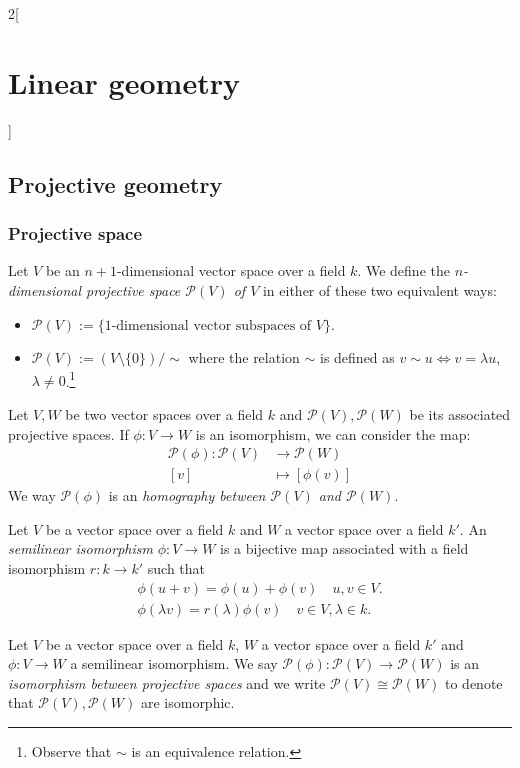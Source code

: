 \documentclass[class=article,10pt,crop=false]{standalone}
\begin{document}
\begin{multicols}{2}[\section{Linear geometry}]
\subsection{Projective geometry}
\subsubsection*{Projective space}
\begin{definition}
Let $V$ be an $n+1$-dimensional vector space over a field $k$. We define the \textit{$n$-dimensional projective space $\mathcal{P}(V)$ of $V$} in either of these two equivalent ways:
\begin{itemize}
    \item $\displaystyle\mathcal{P}(V):=\{\text{1-dimensional vector subspaces of $V$}\}$.
    \item $\displaystyle\mathcal{P}(V):=(V\setminus\{0\})/\sim$ where the relation $\sim$ is defined as $v\sim u\iff v=\lambda u$, $\lambda\ne 0$.\footnote{Observe that $\sim$ is an equivalence relation.}
\end{itemize}
\end{definition}
\begin{definition}
Let $V,W$ be two vector spaces over a field $k$ and $\mathcal{P}(V),\mathcal{P}(W)$ be its associated projective spaces. If $\phi:V\rightarrow W$ is an isomorphism, we can consider the map:
\begin{align*}
    \mathcal{P}(\phi):\mathcal{P}(V)&\rightarrow\mathcal{P}(W)\\
    [v]&\mapsto [\phi(v)]
\end{align*}
We way $\mathcal{P}(\phi)$ is an \textit{homography between $\mathcal{P}(V)$ and $\mathcal{P}(W)$}.
\end{definition}
\begin{definition}
Let $V$ be a vector space over a field $k$ and $W$ a vector space over a field $k'$. An \textit{semilinear isomorphism} $\phi:V\rightarrow W$ is a bijective map associated with a field isomorphism $r:k\rightarrow k'$ such that
\begin{gather*}
    \phi(u+v)=\phi(u)+\phi(v)\quad u,v\in V.\\
    \phi(\lambda v)=r(\lambda)\phi(v)\quad v\in V,\lambda\in k.
\end{gather*}
\end{definition}
\begin{definition}
Let $V$ be a vector space over a field $k$, $W$ a vector space over a field $k'$ and $\phi:V\rightarrow W$ a semilinear isomorphism. We say $\mathcal{P}(\phi):\mathcal{P}(V)\rightarrow\mathcal{P}(W)$ is an \textit{isomorphism between projective spaces} and we write $\mathcal{P}(V)\cong \mathcal{P}(W)$ to denote that $\mathcal{P}(V),\mathcal{P}(W)$ are isomorphic.

\end{definition}
\end{multicols}
\end{document}
